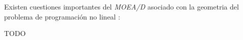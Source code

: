 \documentclass[letterpaper,10pt]{article}
\begin{document}
Existen cuestiones importantes del \emph{MOEA/D} asociado con la geometria del problema de programación no lineal \cite{4358754}:

TODO
% 
% 
% 
% 
% 
\end{document}
